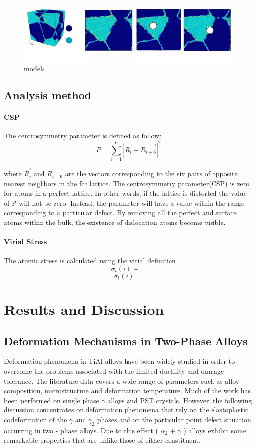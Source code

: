 \documentclass[times]{elsarticle}
\begin{document}
\begin{figure}[h]
	\centering
	\includegraphics[width=1\linewidth]{img/models}
	\caption{models}
	\label{fig:simulation_box}
\end{figure}

\subsection{Analysis method}
\paragraph{CSP}
The centrosymmetry parameter is defined as follow:
\begin{equation} \label{eq:csp} 
	P = \displaystyle\sum_{i=1}^{6}|\vec{R_i}+\vec{R_{i+6}}|^2
\end{equation}

where $\vec{R_i}$ and $\vec{R_{i+6}}$ are the vectors corresponding to the six pairs of opposite nearest neighbors in the fcc lattice. The centrosymmetry parameter(CSP) is zero for atoms in a perfect lattice. In other words, if the lattice is distorted the value of P will not be zero. Instead, the parameter will have a value within the range corresponding to a particular defect. By removing all the perfect and surface atoms within the bulk, the existence of dislocation atoms become visible.
	
\paragraph{Virial Stress}
The atomic stress is calculated using the virial definition :
$$\sigma_t(i)=-$$
$$\sigma_t(i)= $$
 
\section{Results and Discussion}

\subsection{Deformation Mechanisms in Two-Phase Alloys}
Deformation phenomena in TiAl alloys have been widely studied in order to overcome the problems associated with the limited ductility and damage tolerance. The literature data covers a wide range of parameters such as alloy composition, microstructure and deformation temperature. Much of the work has been performed on single phase $\gamma$ alloys and PST crystals. However, the following discussion concentrates on deformation phenomena that rely on the elastoplastic codeformation of the $\gamma$ and $\gamma_2$ phases and on the particular point defect situation occurring in two - phase alloys. Due to this effect ( $\alpha_2$ + $\gamma$ ) alloys exhibit some remarkable properties that are unlike those of either constituent.
\end{document}
